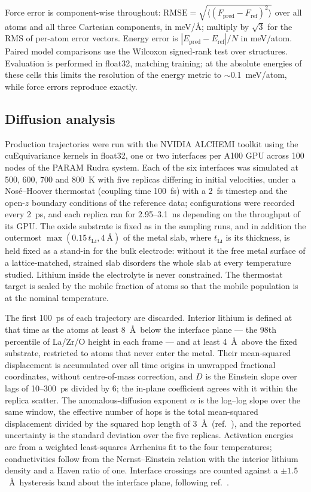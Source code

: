 \documentclass[11pt]{article}
\begin{document}
Force error is component-wise throughout:
$\mathrm{RMSE}=\sqrt{\langle(F_{\mathrm{pred}}-F_{\mathrm{ref}})^2\rangle}$
over all atoms and all three Cartesian components, in meV/\AA; multiply by
$\sqrt{3}$ for the RMS of per-atom error vectors. Energy error is
$|E_{\mathrm{pred}}-E_{\mathrm{ref}}|/N$ in meV/atom. Paired model comparisons
use the Wilcoxon signed-rank test over structures. Evaluation is performed in
float32, matching training; at the absolute energies of these cells this limits
the resolution of the energy metric to $\sim$0.1~meV/atom, while force errors
reproduce exactly.

\subsection{Diffusion analysis}
Production trajectories were run with the NVIDIA ALCHEMI toolkit\citep{alchemi}
using the cuEquivariance kernels in float32, one or two interfaces per A100
GPU across 100 nodes of the PARAM Rudra system. Each of the six interfaces was
simulated at 500, 600, 700 and 800~K with five replicas differing in initial
velocities, under a Nos\'e--Hoover thermostat (coupling time 100~fs) with a
2~fs timestep and the open-$z$ boundary conditions of the reference data;
configurations were recorded every 2~ps, and each replica ran for 2.95--3.1~ns
depending on the throughput of its GPU. The oxide substrate is fixed as in the
sampling runs, and in addition the outermost $\max(0.15\,t_{\mathrm{Li}},
4~\text{\AA})$ of the metal slab, where $t_{\mathrm{Li}}$ is its thickness, is
held fixed as a stand-in for the bulk electrode: without it the free metal
surface of a lattice-matched, strained slab disorders the whole slab at every
temperature studied. Lithium inside the electrolyte is never constrained. The
thermostat target is scaled by the mobile fraction of atoms so that the mobile
population is at the nominal temperature.

The first 100~ps of each trajectory are discarded. Interior lithium is defined
at that time as the atoms at least 8~\AA\ below the interface plane --- the
98th percentile of La/Zr/O height in each frame --- and at least 4~\AA\ above
the fixed substrate, restricted to atoms that never enter the metal. Their
mean-squared displacement is accumulated over all time origins in unwrapped
fractional coordinates, without centre-of-mass correction, and $D$ is the
Einstein slope over lags of 10--300~ps divided by 6; the in-plane coefficient
agrees with it within the replica scatter. The anomalous-diffusion exponent
$\alpha$ is the log--log slope over the same window, the effective number of
hops is the total mean-squared displacement divided by the squared hop length
of 3~\AA\ (ref.~), and the reported uncertainty is the standard
deviation over the five replicas. Activation energies are from a weighted
least-squares Arrhenius fit to the four temperatures; conductivities follow
from the Nernst--Einstein relation with the interior lithium density and a
Haven ratio of one. Interface crossings are counted against a $\pm1.5$~\AA\
hysteresis band about the interface plane, following ref.~.
\end{document}
